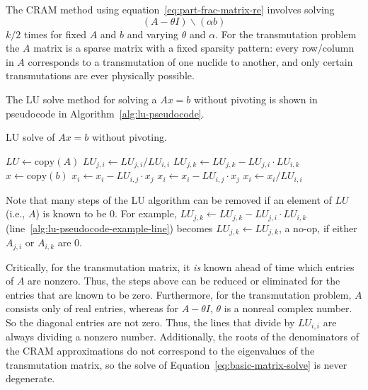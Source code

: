 The CRAM method using equation~\ref{eq:part-frac-matrix-re} involves solving
\begin{equation}
\label{eq:basic-matrix-solve}
 (A - \theta I)\backslash(\alpha b)
\end{equation}
$k/2$ times for fixed $A$ and $b$ and varying $\theta$ and $\alpha$. For the
transmutation problem the $A$ matrix is a sparse matrix with a fixed sparsity
pattern: every row/column in $A$ corresponds to a transmutation of one nuclide
to another, and only certain transmutations are ever physically possible.

The LU solve method for solving a $Ax=b$ without pivoting is shown in
pseudocode in Algorithm~\ref{alg:lu-pseudocode}.
\begin{algorithm}
  \caption{LU solve of $Ax=b$ without pivoting.}\label{alg:lu-pseudocode}
  \begin{algorithmic}[1]
  \STATE {}
  \STATE {}
  \STATE
  \STATE $LU \leftarrow \mathrm{copy}(A)$
  \STATE
        \STATE $LU_{j, i} \leftarrow LU_{j, i}/LU_{i, i}$
    \ENDFOR
  \ENDFOR
  \STATE
    \STATE $LU_{j, k} \leftarrow LU_{j, k} - LU_{j, i}\cdot LU_{i, k}$\label{alg:lu-pseudocode-example-line}
  \ENDFOR
  \STATE
  \STATE {}
  \STATE $x \leftarrow \mathrm{copy}(b)$
  \STATE
  \STATE {}
          \STATE $x_i \leftarrow x_i - LU_{i, j}\cdot x_j$
      \ENDFOR
  \ENDFOR
  \STATE
  \STATE {}
          \STATE $x_i \leftarrow x_i -LU_{i, j}\cdot x_j$
      \ENDFOR
      \STATE $x_i \leftarrow x_i/LU_{i, i}$
  \ENDFOR

\end{algorithmic}
\end{algorithm}

Note that many steps of the LU algorithm can be removed if an element of $LU$
(i.e., $A$) is known to be 0. For example,
$LU_{j, k} \leftarrow LU_{j, k} - LU_{j, i}\cdot LU_{i, k}$
(line~\ref{alg:lu-pseudocode-example-line}) becomes
$LU_{j, k} \leftarrow LU_{j, k}$, a no-op, if either $A_{j, i}$ or $A_{i, k}$
are 0.

Critically, for the transmutation matrix, it \textit{is} known ahead of time
which entries of $A$ are nonzero. Thus, the steps above can be reduced or
eliminated for the entries that are known to be zero. Furthermore, for the
transmutation problem, $A$ consists only of real entries, whereas for
$A - \theta I$, $\theta$ is a nonreal complex number. So the diagonal entries
are not zero. Thus, the lines that divide by $LU_{i,i}$ are always dividing a
nonzero number.  Additionally, the roots of the denominators of the CRAM
approximations do not correspond to the eigenvalues of the transmutation
matrix, so the solve of Equation~\ref{eq:basic-matrix-solve} is never
degenerate.

